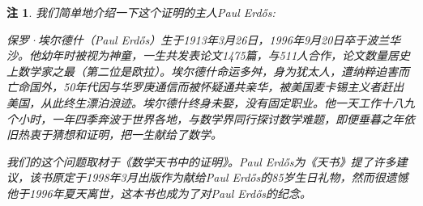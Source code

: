 \documentclass{article}
\newtheorem{note}{注}[subsection]
\begin{document}
\begin{note}
我们简单地介绍一下这个证明的主人Paul Erdős:\par
保罗·埃尔德什（Paul Erdős）生于1913年3月26日，1996年9月20日卒于波兰华沙。他幼年时被视为神童，一生共发表论文1475篇，与511人合作，论文数量居史上数学家之最（第二位是欧拉）。埃尔德什命运多舛，身为犹太人，遭纳粹迫害而亡命国外，50年代因与华罗庚通信而被怀疑通共亲华，被美国麦卡锡主义者赶出美国，从此终生漂泊浪迹。埃尔德什终身未娶，没有固定职业。他一天工作十八九个小时，一年四季奔波于世界各地，与数学界同行探讨数学难题，即便垂暮之年依旧热衷于猜想和证明，把一生献给了数学。\par
我们的这个问题取材于《数学天书中的证明》。Paul Erdős为《天书》提了许多建议，该书原定于1998年3月出版作为献给Paul Erdős的85岁生日礼物，然而很遗憾他于1996年夏天离世，这本书也成为了对Paul Erdős的纪念。
\end{note}
\end{document}
